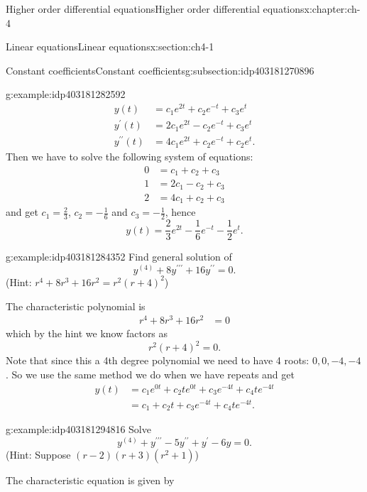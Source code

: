 \documentclass[oneside,10pt,]{book}
\numberwithin{equation}{section}
\numberwithin{equation}{section}
\newcommand{\amp}{&}
\begin{document}
\begin{chapterptx}{Higher order differential equations}{}{Higher order differential equations}{}{}{x:chapter:ch-4}
\begin{sectionptx}{Linear equations}{}{Linear equations}{}{}{x:section:ch4-1}
\begin{subsectionptx}{Constant coefficients}{}{Constant coefficients}{}{}{g:subsection:idp403181270896}
\begin{example}{}{g:example:idp403181282592}
\begin{align*}
y(t) \amp =c_{1}e^{2t}+c_{2}e^{-t}+c_{3}e^{t}\\
y^{\prime}(t) \amp =2c_{1}e^{2t}-c_{2}e^{-t}+c_{3}e^{t}\\
y^{\prime\prime}(t) \amp =4c_{1}e^{2t}+c_{2}e^{-t}+c_{2}e^{t}.
\end{align*}
Then we have to solve the following system of equations:%
\begin{align*}
0 \amp =c_{1}+c_{2}+c_{3}\\
1 \amp =2c_{1}-c_{2}+c_{3}\\
2 \amp =4c_{1}+c_{2}+c_{3}
\end{align*}
and get \(c_{1}=\frac{2}{3}\), \(c_{2}=-\frac{1}{6}\) and \(c_{3}=-\frac{1}{2}\), hence%
\begin{equation*}
y(t)=\frac{2}{3}e^{2t}-\frac{1}{6}e^{-t}-\frac{1}{2}e^{t}.
\end{equation*}
%
\end{example}
\begin{example}{}{g:example:idp403181284352}%
Find general solution of%
\begin{equation*}
y^{(4)}+8y^{\prime\prime\prime}+16y^{\prime\prime}=0.
\end{equation*}
(Hint: \(r^{4}+8r^{3}+16r^{2}=r^{2}\left(r+4\right)^{2}\))%
\par
The characteristic polynomial is%
\begin{align*}
r^{4}+8r^{3}+16r^{2} \amp =0
\end{align*}
which by the hint we know factors as%
\begin{equation*}
r^{2}\left(r+4\right)^{2}=0.
\end{equation*}
Note that since this a 4th degree polynomial we need to have 4 roots: \(0,0,-4,-4\). So we use the same method we do when we have repeats and get%
\begin{align*}
y(t) \amp =c_{1}e^{0t}+c_{2}te^{0t}+c_{3}e^{-4t}+c_{4}te^{-4t}\\
\amp =c_{1}+c_{2}t+c_{3}e^{-4t}+c_{4}te^{-4t}.
\end{align*}
%
\end{example}
\begin{example}{}{g:example:idp403181294816}%
Solve%
\begin{equation*}
y^{(4)}+y^{\prime\prime\prime}-5y^{\prime\prime}+y^{\prime}-6y=0.
\end{equation*}
(Hint: Suppose \(\left(r-2\right)\left(r+3\right)\left(r^{2}+1\right)\))%
\par
The characteristic equation is given by%

\end{example}
\end{subsectionptx}
\end{sectionptx}
\end{chapterptx}
\end{document}
